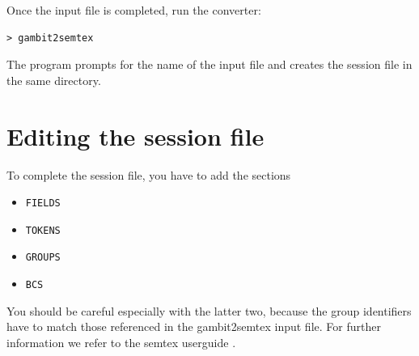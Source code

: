 \documentclass{article}
\begin{document}
Once the input file is completed, run the converter:

\begin{verbatim}
> gambit2semtex
\end{verbatim}

The program prompts for the name of the input file and creates the
session file in the same directory.

\section{Editing the session file}

To complete the session file, you have to add the sections
\begin{itemize}
\item \texttt{FIELDS}
\item \texttt{TOKENS}
\item \texttt{GROUPS}
\item \texttt{BCS}
\end{itemize}
You should be careful especially with the latter two, because the group
identifiers have to match those referenced in the gambit2semtex
input file. 
For further information we refer to the semtex userguide \cite{semtex}.

 

\end{document}
